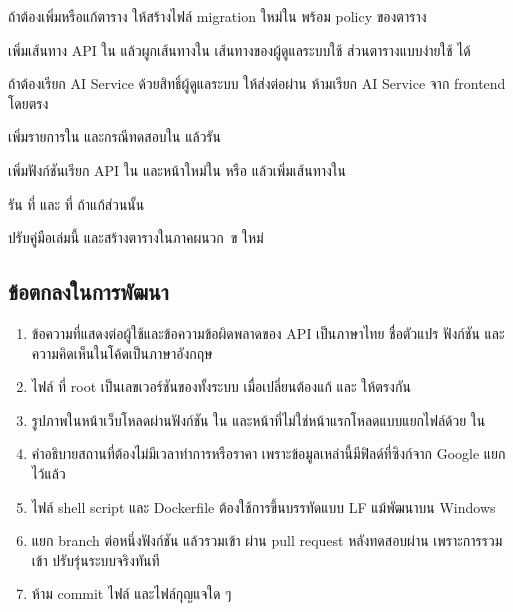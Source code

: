 \begin{steps}
  \item ถ้าต้องเพิ่มหรือแก้ตาราง ให้สร้างไฟล์ migration ใหม่ใน  พร้อม policy ของตาราง
  \item เพิ่มเส้นทาง API ใน  แล้วผูกเส้นทางใน  เส้นทางของผู้ดูแลระบบใช้  ส่วนตารางแบบง่ายใช้  ได้
  \item ถ้าต้องเรียก AI Service ด้วยสิทธิ์ผู้ดูแลระบบ ให้ส่งต่อผ่าน  ห้ามเรียก AI Service จาก frontend โดยตรง
  \item เพิ่มรายการใน  และกรณีทดสอบใน  แล้วรัน 
  \item เพิ่มฟังก์ชันเรียก API ใน  และหน้าใหม่ใน  หรือ  แล้วเพิ่มเส้นทางใน 
  \item รัน  ที่  และ  ที่  ถ้าแก้ส่วนนั้น
  \item ปรับคู่มือเล่มนี้ และสร้างตารางในภาคผนวก~ข ใหม่
\end{steps}

\subsection{ข้อตกลงในการพัฒนา}

\begin{enumerate}
\item ข้อความที่แสดงต่อผู้ใช้และข้อความข้อผิดพลาดของ API เป็นภาษาไทย ชื่อตัวแปร ฟังก์ชัน และความคิดเห็นในโค้ดเป็นภาษาอังกฤษ
\item ไฟล์  ที่ root เป็นเลขเวอร์ชันของทั้งระบบ เมื่อเปลี่ยนต้องแก้  และ  ให้ตรงกัน
\item รูปภาพในหน้าเว็บโหลดผ่านฟังก์ชัน  ใน  และหน้าที่ไม่ใช่หน้าแรกโหลดแบบแยกไฟล์ด้วย  ใน 
\item คำอธิบายสถานที่ต้องไม่มีเวลาทำการหรือราคา เพราะข้อมูลเหล่านี้มีฟิลด์ที่ซิงก์จาก Google แยกไว้แล้ว
\item ไฟล์ shell script และ Dockerfile ต้องใช้การขึ้นบรรทัดแบบ LF แม้พัฒนาบน Windows
\item แยก branch ต่อหนึ่งฟังก์ชัน แล้วรวมเข้า  ผ่าน pull request หลังทดสอบผ่าน เพราะการรวมเข้า  ปรับรุ่นระบบจริงทันที
\item ห้าม commit ไฟล์  และไฟล์กุญแจใด ๆ
\end{enumerate}

